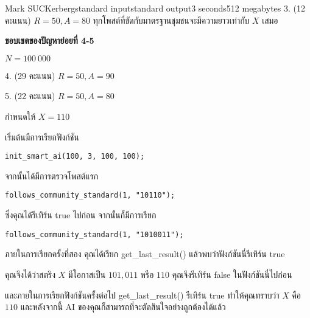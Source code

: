 \documentclass[11pt,a4paper]{article}
\begin{document}
\begin{problem}{Mark SUCKerberg}{standard input}{standard output}{3 seconds}{512 megabytes}
3. (12 คะแนน) $R = 50, A = 80$ ทุกโพสต์ที่ขัดกับมาตรฐานชุมชนจะมีความยาวเท่ากับ $X$ เสมอ

\textbf{ขอบเขตของปัญหาย่อยที่ 4-5}

$N = 100\ 000$

4. (29 คะแนน) $R = 50, A = 90$

5. (22 คะแนน) $R = 50, A = 80$

\Ex

กำหนดให้ $X = 110$

เริ่มต้นมีการเรียกฟังก์ชัน

\begin{verbatim}
init_smart_ai(100, 3, 100, 100);
\end{verbatim}

จากนั้นได้มีการตรวจโพสต์แรก

\begin{verbatim}
follows_community_standard(1, "10110");
\end{verbatim}

ซึ่งคุณได้รีเทิร์น true ไปก่อน จากนั้นก็มีการเรียก

\begin{verbatim}
follows_community_standard(1, "1010011");
\end{verbatim}

ภายในการเรียกครั้งที่สอง คุณได้เรียก get\_last\_result() แล้วพบว่าฟังก์ชันนี่รีเทิร์น true

คุณจึงได้ว่าสตริง $X$ มีโอกาสเป็น $101, 011$ หรือ $110$ คุณจึงรีเทิร์น false ในฟังก์ชันนี่ไปก่อน

และภายในการเรียกฟังก์ชันครั้งต่อไป get\_last\_result() รีเทิร์น true
ทำให้คุณทราบว่า $X$ คือ $110$ และหลังจากนี้ AI ของคุณก็สามารถที่จะตัดสินใจอย่างถูกต้องได้แล้ว

\end{problem}
\end{document}
